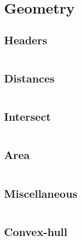 \section{Geometry}
\subsection{Headers}
\inputminted[frame=single,framesep=3pt,breaklines=true,tabsize=2,linenos]{c++}{geometry/geometry.h}

\subsection{Distances}
\inputminted[frame=single,framesep=3pt,breaklines=true,tabsize=2,linenos,label=O(1)]{c++}{geometry/distance.cpp}

\subsection{Intersect}
\inputminted[frame=single,framesep=3pt,breaklines=true,tabsize=2,linenos,label=O(1)]{c++}{geometry/intersect.cpp}

\subsection{Area}
\inputminted[frame=single,framesep=3pt,breaklines=true,tabsize=2,linenos,label=O(N)]{c++}{geometry/area.cpp}

\subsection{Miscellaneous}
\inputminted[frame=single,framesep=3pt,breaklines=true,tabsize=2,linenos,label=O(N)]{c++}{geometry/misc.cpp}

\subsection{Convex-hull}
\inputminted[frame=single,framesep=3pt,breaklines=true,tabsize=2,linenos,label=O(N log(N))]{c++}{geometry/convex-hull.cpp}